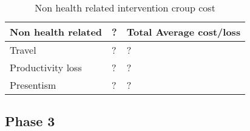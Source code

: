 \begin{table}[H]
\begin{longtabu} to 
    \textbf{Non health related} &        \textbf{?} & \textbf{Total Average cost/loss} \\[-1ex]
    \midrule
     Travel   &    ? & ? \\ \hline
     Productivity loss   &       ? & ? \\ \hline
     Presentism   &        ? & ?
    \newline
   \end{longtabu}
\caption{Non health related intervention croup cost}
\label{tab: IC}
\end{table}

\subsection{Phase 3}


















